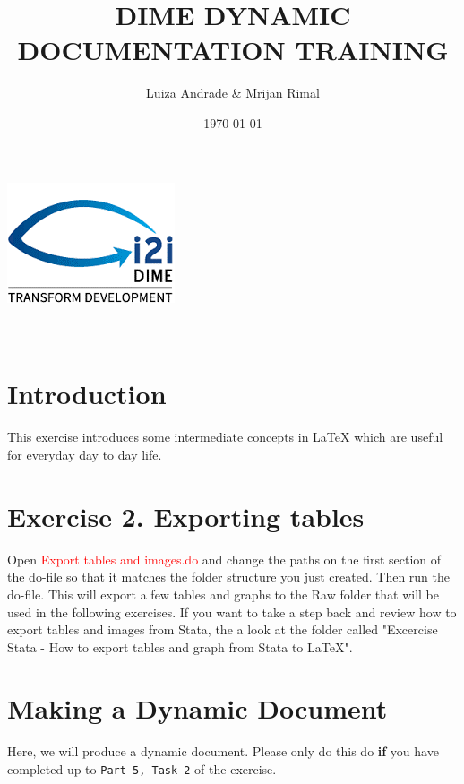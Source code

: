 \documentclass[12pts]{report}
\title{DIME DYNAMIC DOCUMENTATION TRAINING }
\author{Luiza Andrade \& Mrijan Rimal}
\date{\today}
\begin{document}
	
	
	\makeatletter
	\begin{titlepage}
		\begin{center}
			\includegraphics[width=0.3\linewidth]{../img/i2i.png}\\[10ex]
			{\LARGE \bfseries  \@title }\\[2ex] 
			{\Large  \@author}\\[20ex] 
			{\large \@date}
		\end{center}
	\end{titlepage}
	\makeatother
	
\section*{Introduction}
This exercise introduces some intermediate concepts in {\LaTeX} which are useful for everyday day to day life. 

\section*{Exercise 2. Exporting tables}
Open \textcolor{red}{Export tables and images.do} and change the paths on the first section of the do-file so that it matches the folder structure you just created. Then run the do-file. This will export a few tables and graphs to the Raw folder that will be used in the following exercises. If you want to take a step back and review how to export tables and images from Stata, the a look at the folder called "Excercise Stata - How to export tables and graph from Stata to LaTeX".

\section*{Making a Dynamic Document }

Here, we will produce a dynamic document. Please only do this do \textbf{if} you have completed up to \texttt{Part 5, Task 2} of the exercise. 
\end{document}
